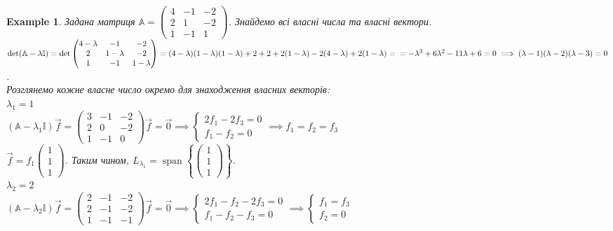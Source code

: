 \documentclass[a4paper, 10pt]{article}
\theoremstyle{theoremdd}
\newtheorem{example}[theorem]{Example}
\DeclareMathOperator{\linspan}{span}
\begin{document}
\begin{example}
\label{find_eigenvectors}
Задана матриця $\mathbb{A} = \begin{pmatrix}
4 & -1 & -2 \\
2 & 1 & -2 \\
1 & -1 & 1
\end{pmatrix}$. Знайдемо всі власні числа та власні вектори.\\
$\det (\mathbb{A} - \lambda \mathbb{I}) = \det \begin{pmatrix}
4-\lambda & -1 & -2 \\
2 & 1-\lambda & -2 \\
1 & -1 & 1-\lambda
\end{pmatrix} = (4-\lambda)(1-\lambda)(1-\lambda) + 2 + 2 + 2(1-\lambda) -2(4-\lambda) +2(1-\lambda) = \\ = -\lambda^3 + 6 \lambda^2 - 11 \lambda + 6 = 0 \implies (\lambda - 1)(\lambda -2)(\lambda - 3) = 0$.\\
Розглянемо кожне власне число окремо для знаходження власних векторів:\\
$\lambda_1 = 1$\\
$(\mathbb{A} - \lambda_1 \mathbb{I})\vec{f} =\begin{pmatrix}
3 & -1 & -2 \\
2 & 0 & -2 \\
1 & -1 & 0
\end{pmatrix} \vec{f} = \vec{0} \implies \begin{cases} 2f_1 - 2f_3 = 0 \\ f_1 - f_2 = 0 \end{cases} \implies f_1 = f_2 = f_3$\\
$\vec{f} = f_1 \begin{pmatrix}
1 \\ 1 \\ 1
\end{pmatrix}$. Таким чином, $L_{\lambda_1} = \linspan\left\{ \begin{pmatrix}
1 \\ 1 \\ 1
\end{pmatrix} \right\}$.
\bigskip \\
$\lambda_2 = 2$\\
$(\mathbb{A} - \lambda_2 \mathbb{I})\vec{f} =\begin{pmatrix}
2 & -1 & -2 \\
2 & -1 & -2 \\
1 & -1 & -1
\end{pmatrix} \vec{f} = \vec{0} \implies \begin{cases} 2f_1 - f_2 - 2f_3 = 0 \\ f_1 - f_2 - f_3 = 0 \end{cases} \implies \begin{cases} f_1 = f_3 \\ f_2 = 0 \end{cases}$\\

\end{example}
\end{document}
